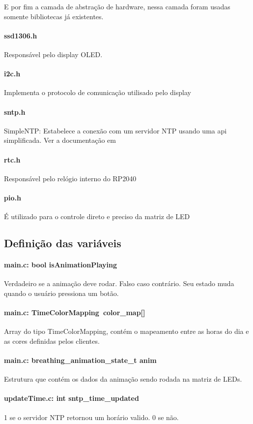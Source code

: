 \documentclass[12pt]{article}
\begin{document}
E por fim a camada de abstração de hardware, nessa camada foram usadas somente bibliotecas já existentes.
\paragraph{ssd1306.h} Responsável pelo display OLED. \cite{BitDogLabC}
\paragraph{i2c.h} Implementa o protocolo de comunicação utilisado pelo display
\paragraph{sntp.h} SimpleNTP: Estabelece a conexão com um servidor NTP usando uma api simplificada. Ver a documentação em \cite{sntp}
\paragraph{rtc.h} Responsável pelo relógio interno do RP2040
\paragraph{pio.h} É utilizado para o controle direto e preciso da matriz de LED
\pagebreak
\subsection{Definição das variáveis}
\paragraph{main.c: bool isAnimationPlaying} Verdadeiro se a animação deve rodar. Falso caso contrário. Seu estado muda quando o usuário pressiona um botão.
\paragraph{main.c: TimeColorMapping\ color\_map[]} Array do tipo TimeColorMapping, contém o mapeamento entre as horas do dia e as cores definidas pelos clientes.
\paragraph{main.c: breathing\_animation\_state\_t anim} Estrutura que contém os dados da animação sendo rodada na matriz de LEDs.

\paragraph{updateTime.c: int sntp\_time\_updated} 1 se o servidor NTP retornou um horário valido. 0 se não. 
\end{document}
